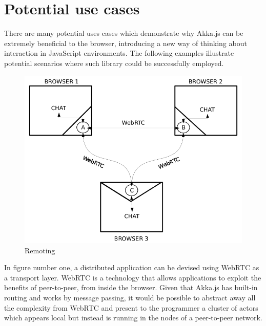 \documentclass{sig-alternate}
\begin{document}
\section{Potential use cases}\label{sec:usecases}

There are many potential uses cases which demonstrate why Akka.js can be extremely beneficial to the browser, introducing a new way of thinking about interaction in JavaScript environments. The following examples illustrate
potential scenarios where such library could be successfully employed.

\begin{figure}
\centering
\includegraphics[scale=0.2]{1.png}
\caption{Remoting}
\label{fig:remoting}
\end{figure}

In figure number one, a distributed application can be devised using WebRTC as a transport layer.
WebRTC is a technology that allows applications to exploit the benefits of peer-to-peer, from inside
the browser. Given that Akka.js has built-in routing and works by message passing, it would be
possible to abstract away all the complexity from WebRTC and present to the programmer a cluster of
actors which appears local but instead is running in the nodes of a peer-to-peer network.
\end{document}
